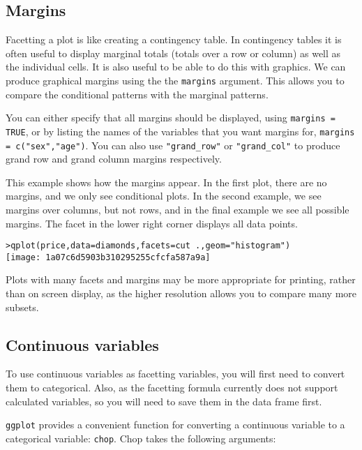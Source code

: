 \subsection{Margins}\label{sub:margins}

Facetting a plot is like creating a contingency table.  In contingency tables it is often useful to display marginal totals (totals over a row or column) as well as the individual cells.  It is also useful to be able to do this with graphics.  We can produce graphical margins using the the {\tt margins} argument.  This allows you to compare the conditional patterns with the marginal patterns.

You can either specify that all margins should be displayed, using {\tt margins = TRUE}, or by listing the names of the variables that you want margins for, {\tt margins = c("sex","age")}.  You can also use \verb|"grand_row"| or \verb|"grand_col"| to produce grand row and grand column margins respectively.

This example shows how the margins appear.  In the first plot, there are no margins, and we only see conditional plots.  In the second example, we see margins over columns, but not rows, and in the final example we see all possible margins.  The facet in the lower right corner displays all data points.

\begin{alltt}
> qplot(price, data = diamonds, facets = cut ~ ., geom = "histogram")
\texttt{[image: 1a07c6d5903b310295255cfcfa587a9a]}

\end{alltt}

Plots with many facets and margins may be more appropriate for printing, rather than on screen display, as the higher resolution allows you to compare many more subsets.

\subsection{Continuous variables}\label{sub:continuous_variables}

To use continuous variables as facetting variables, you will first need to convert them to categorical.  Also, as the facetting formula currently does not support calculated variables, so you will need to save them in the data frame first.

{\tt ggplot} provides a convenient function for converting a continuous variable to a categorical variable: {\tt chop}.  Chop takes the following arguments:

